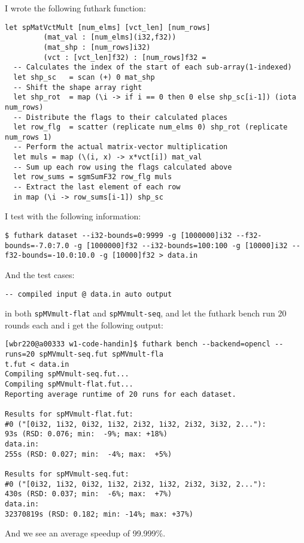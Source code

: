 \documentclass[11pt]{article}
\begin{document}
I wrote the following futhark function:
\begin{verbatim}
let spMatVctMult [num_elms] [vct_len] [num_rows] 
		 (mat_val : [num_elms](i32,f32))
		 (mat_shp : [num_rows]i32)
		 (vct : [vct_len]f32) : [num_rows]f32 =
  -- Calculates the index of the start of each sub-array(1-indexed)
  let shp_sc   = scan (+) 0 mat_shp
  -- Shift the shape array right
  let shp_rot  = map (\i -> if i == 0 then 0 else shp_sc[i-1]) (iota num_rows)
  -- Distribute the flags to their calculated places
  let row_flg  = scatter (replicate num_elms 0) shp_rot (replicate num_rows 1)
  -- Perform the actual matrix-vector multiplication
  let muls = map (\(i, x) -> x*vct[i]) mat_val
  -- Sum up each row using the flags calculated above
  let row_sums = sgmSumF32 row_flg muls
  -- Extract the last element of each row
  in map (\i -> row_sums[i-1]) shp_sc
\end{verbatim}

I test with the following information:
\begin{verbatim}
$ futhark dataset --i32-bounds=0:9999 -g [1000000]i32 --f32-bounds=-7.0:7.0 -g [1000000]f32 --i32-bounds=100:100 -g [10000]i32 --f32-bounds=-10.0:10.0 -g [10000]f32 > data.in
\end{verbatim}
And the test cases:
\begin{verbatim}
-- compiled input @ data.in auto output
\end{verbatim}
in both \texttt{spMVmult-flat} and \texttt{spMVmult-seq}, and let the futhark bench run 20 rounds each and i get 
the following output:
\begin{verbatim}
[wbr220@a00333 w1-code-handin]$ futhark bench --backend=opencl --runs=20 spMVmult-seq.fut spMVmult-fla
t.fut < data.in
Compiling spMVmult-seq.fut...
Compiling spMVmult-flat.fut...
Reporting average runtime of 20 runs for each dataset.

Results for spMVmult-flat.fut:
#0 ("[0i32, 1i32, 0i32, 1i32, 2i32, 1i32, 2i32, 3i32, 2..."):         93s (RSD: 0.076; min:  -9%; max: +18%)
data.in:                                                             255s (RSD: 0.027; min:  -4%; max:  +5%)

Results for spMVmult-seq.fut:
#0 ("[0i32, 1i32, 0i32, 1i32, 2i32, 1i32, 2i32, 3i32, 2..."):        430s (RSD: 0.037; min:  -6%; max:  +7%)
data.in:                                                        32370819s (RSD: 0.182; min: -14%; max: +37%)
\end{verbatim}
And we see an average speedup of 99.999\%.
\end{document}
